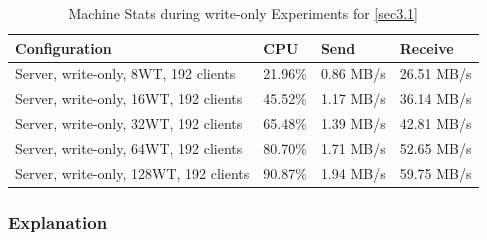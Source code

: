 \documentclass[11pt,a4paper]{article}
\begin{document}
\begin{center}
    \begin{table}
    	\begin{tabular}{|l|p{2cm}|p{2cm}|p{2cm}|}
            \hline \textbf{Configuration} & \textbf{CPU} & \textbf{Send} & \textbf{Receive}\\
            \hline Server, write-only, 8WT, 192 clients & 21.96\%         & 0.86 MB/s    & 26.51 MB/s\\
            \hline Server, write-only, 16WT, 192 clients & 45.52\%         & 1.17 MB/s    & 36.14 MB/s\\
            \hline Server, write-only, 32WT, 192 clients & 65.48\%         & 1.39 MB/s    & 42.81 MB/s\\
            \hline Server, write-only, 64WT, 192 clients & 80.70\%         & 1.71 MB/s    & 52.65 MB/s\\
            \hline Server, write-only, 128WT, 192 clients & 90.87\%         & 1.94 MB/s    & 59.75 MB/s\\
            \hline
    	\end{tabular}
	\caption{Machine Stats during write-only Experiments for \autoref{sec3.1}}
    \label{dstat:3-1wo}
	\end{table}
\end{center}

\subsubsection{Explanation}
\end{document}
